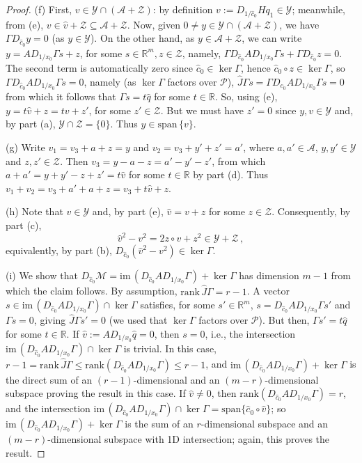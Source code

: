 \documentclass[11pt]{amsart}
\newcommand{\R}{\mathbb{R}}
\newcommand{\wJ}{\hat{J}}
\newcommand{\mA}{\mathcal{A}}
\newcommand{\mP}{\mathcal{P}}
\newcommand{\mM}{\mathcal{M}}
\newcommand{\mY}{\mathcal{Y}}
\newcommand{\mZ}{\mathcal{Z}}
\theoremstyle{definition}
\begin{document}
\begin{proof}
(f) First, $v \in \mY \cap (\mA + \mZ)$: by definition $v := D_{1/\hat{c}_0}H q_1 \in \mY$; meanwhile, from (e), $v \in \hat{v} + \mZ \subseteq \mA + \mZ$. Now, given $0 \neq y \in \mY \cap (\mA+\mZ)$, we have $\Gamma D_{\hat{c}_0} y = 0$ (as $y \in \mY$). On the other hand, as $y \in \mA + \mZ$, we can write $y = A D_{1/x_0} \Gamma s + z$, for some $s \in \R^m, z \in \mZ$, namely, $\Gamma D_{\hat{c}_0} A D_{1/x_0} \Gamma s + \Gamma D_{\hat{c}_0} z = 0$. The second term is automatically zero since $\hat{c}_0 \in \ker \Gamma$, hence $\hat{c}_0 \circ z \in \ker \Gamma$, so $\Gamma D_{\hat{c}_0} A D_{1/x_0} \Gamma s = 0$, namely (as $\ker \Gamma$ factors over $\mP$), $\wJ\Gamma s = \Gamma D_{c_0} A D_{1/x_0} \Gamma s = 0$ from which it follows that $\Gamma s = t \hat{q}$ for some $t \in \R$. So, using (e), $y = t\hat{v} + z = t v + z'$, for some $z' \in \mZ$. But we must have $z'=0$ since $y,v \in \mY$ and, by part (a), $\mY \cap \mZ = \{0\}$. Thus $y \in \mathrm{span}\,\{v\}$.

(g) Write $v_1 = v_3 + a + z = y$ and $v_2 = v_3 + y' + z' = a'$, where $a,a' \in \mA$, $y,y' \in \mY$ and $z,z' \in \mZ$. Then $v_3 = y-a-z = a'-y'-z'$, from which $a + a' = y + y' -z + z' = t \hat{v}$ for some $t \in \R$ by part (d). Thus $v_1 + v_2 = v_3 + a'+ a + z = v_3 + t\hat{v} + z$.

(h) Note that $v \in \mY$ and, by part (e), $\hat{v} = v + z$ for some $z \in \mZ$. Consequently, by part (c), 
\[
\hat{v}^2 -v^2 =  2z \circ v + z^2 \in \mY + \mZ\,,
\]
equivalently, by part (b), $D_{\hat{c}_0}(\hat{v}^2 - v^2) \in \ker \Gamma$.

(i) We show that $D_{\hat{c}_0}\mM = \mathrm{im}\,(D_{\hat{c}_0}AD_{1/x_0}\Gamma) + \ker \Gamma$ has dimension $m-1$ from which the claim follows. By assumption, $\mathrm{rank}\,\wJ\Gamma = r-1$. A vector $s \in \mathrm{im}\,(D_{\hat{c}_0}AD_{1/x_0}\Gamma) \cap \ker \Gamma$ satisfies, for some $s' \in \R^m$, $s = D_{\hat{c}_0}AD_{1/x_0}\Gamma s'$ and $\Gamma s = 0$, giving $\wJ\Gamma s'=0$ (we used that $\ker \Gamma$ factors over $\mP$). But then, $\Gamma s' = t\hat{q}$ for some $t \in \R$. If $\hat{v} := AD_{1/x_0} \hat{q} = 0$, then $s=0$, i.e., the intersection $\mathrm{im}\,(D_{\hat{c}_0}AD_{1/x_0}\Gamma) \cap \ker \Gamma$ is trivial. In this case, $r-1 = \mathrm{rank}\,\wJ\Gamma \leq \mathrm{rank}(D_{\hat{c}_0}AD_{1/x_0}\Gamma) \leq r-1$, and $\mathrm{im}\,(D_{\hat{c}_0}AD_{1/x_0}\Gamma) + \ker \Gamma$ is the direct sum of an $(r-1)$-dimensional and an $(m-r)$-dimensional subspace proving the result in this case. If $\hat{v} \neq 0$, then $\mathrm{rank}(D_{\hat{c}_0}AD_{1/x_0}\Gamma) = r$, and the intersection $\mathrm{im}\,(D_{\hat{c}_0}AD_{1/x_0}\Gamma) \cap \ker \Gamma = \mathrm{span}\{\hat{c}_0 \circ \hat{v}\}$; so $\mathrm{im}\,(D_{\hat{c}_0}AD_{1/x_0}\Gamma) + \ker \Gamma$ is the sum of an $r$-dimensional subspace and an $(m-r)$-dimensional subspace with 1D intersection; again, this proves the result.
\end{proof}
\end{document}

